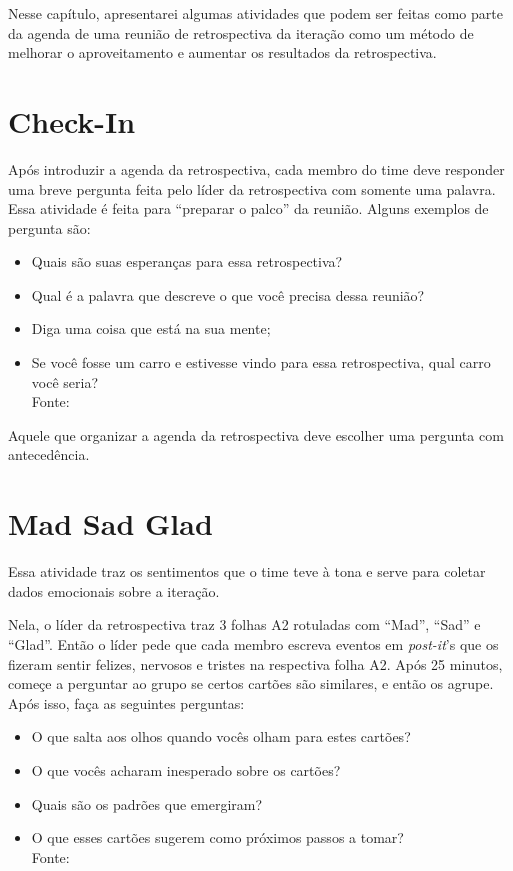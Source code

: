 \documentclass{iiufrgs}
\newcommand{\fonte}[1]{\\Fonte: {#1}}
\begin{document}
Nesse capítulo, apresentarei algumas atividades que podem ser feitas como parte da agenda de uma reunião de retrospectiva da iteração como um método de melhorar o aproveitamento e aumentar os resultados da retrospectiva.

\section{Check-In}

Após introduzir a agenda da retrospectiva, cada membro do time deve responder uma breve pergunta feita pelo líder da retrospectiva com somente uma palavra. Essa atividade é feita para \enquote{preparar o palco} da reunião. Alguns exemplos de pergunta são:

\begin{itemize}[leftmargin=3em, noitemsep, nosep, before=\vspace{1cm}, after=\vspace{1cm}]
    \setlength{\itemindent}{1em}
    \item Quais são suas esperanças para essa retrospectiva?
    \item Qual é a palavra que descreve o que você precisa dessa reunião?
    \item Diga uma coisa que está na sua mente;
    \item Se você fosse um carro e estivesse vindo para essa retrospectiva, qual carro você seria?
    \fonte{\cite{Derby2006Retrospectives}}
\end{itemize}

Aquele que organizar a agenda da retrospectiva deve escolher uma pergunta com antecedência.

\section{Mad Sad Glad}

Essa atividade traz os sentimentos que o time teve à tona e serve para coletar dados emocionais sobre a iteração.

Nela, o líder da retrospectiva traz 3 folhas A2 rotuladas com \enquote{Mad}, \enquote{Sad} e \enquote{Glad}. Então o líder pede que cada membro escreva eventos em \textit{post-it}'s que os fizeram sentir felizes, nervosos e tristes na respectiva folha A2. Após 25 minutos, começe a perguntar ao grupo se certos cartões são similares, e então os agrupe. Após isso, faça as seguintes perguntas:

\begin{itemize}[leftmargin=3em, noitemsep, nosep, before=\vspace{1cm}, after=\vspace{1cm}]
    \setlength{\itemindent}{1em}
    \item O que salta aos olhos quando vocês olham para estes cartões?
    \item O que vocês acharam inesperado sobre os cartões?
    \item Quais são os padrões que emergiram?
    \item O que esses cartões sugerem como próximos passos a tomar?
    \fonte{\cite{Derby2006Retrospectives}}
\end{itemize}
\end{document}
